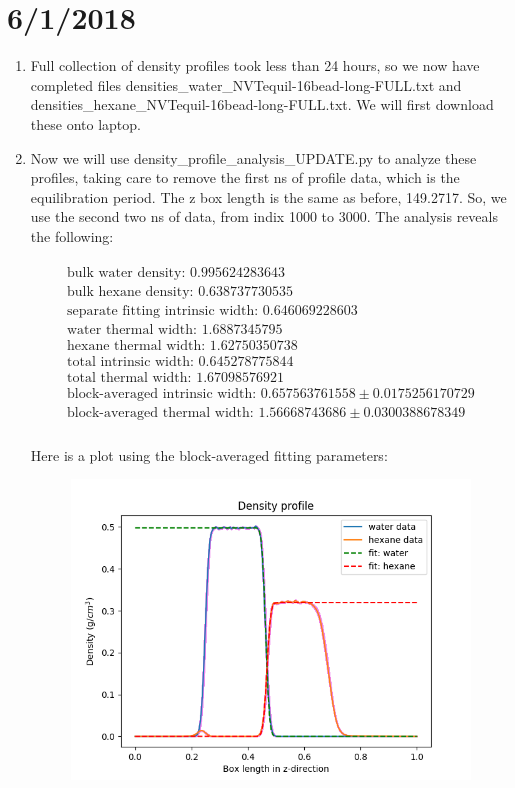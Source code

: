 \documentclass[12pt,reqno]{amsart}
\numberwithin{equation}{section}
\begin{document}
\section{6/1/2018}
\begin{enumerate}
\item Full collection of density profiles took less than 24 hours, so we now have completed files densities\_water\_NVTequil-16bead-long-FULL.txt and densities\_hexane\_NVTequil-16bead-long-FULL.txt.  We will first download these onto laptop.  
\item Now we will use density\_profile\_analysis\_UPDATE.py to analyze these profiles, taking care to remove the first ns of profile data, which is the equilibration period.  The z box length is the same as before, 149.2717.  So, we use the second two ns of data, from indix 1000 to 3000.  The analysis reveals the following: 

\begin{align}
\begin{split}
\text{bulk water density: } 0.995624283643 \\
\text{bulk hexane density: } 0.638737730535 \\
\text{separate fitting intrinsic width: } 0.646069228603 \\
\text{water thermal width: } 1.6887345795 \\
\text{hexane thermal width: } 1.62750350738 \\
\text{total intrinsic width: } 0.645278775844 \\
\text{total thermal width: } 1.67098576921 \\
\text{block-averaged intrinsic width: } 0.657563761558 \pm 0.0175256170729\\
\text{block-averaged thermal width: } 1.56668743686 \pm 0.0300388678349 \\
\end{split}
\end{align} 

Here is a plot using the block-averaged fitting parameters:

\begin{figure}[H]
\centering
\includegraphics[scale=0.6]{interface_density_profile_NVTequil-16bead-long-FULL}
\end{figure}


\end{enumerate}
\end{document}
